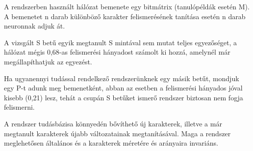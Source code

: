 A rendszerben használt hálózat bemenete egy bitmátrix (tanulópéldák esetén M). A bemenetet n darab különböző karakter felismerésének tanítása esetén n darab neuronnak adjuk át.

A vizsgált S betű egyik megtanult S mintával sem mutat teljes egyezőséget, a hálózat mégis 0,68-as felismerési hányadost számolt ki hozzá, amelynél már megállapíthatjuk az egyezést.

Ha ugyanennyi tudással rendelkező rendszerünknek egy másik betűt, mondjuk egy P-t adunk meg bemenetként, abban az esetben a felismerési hányados jóval kisebb (0,21) lesz, tehát a csupán S betűket ismerő rendszer biztosan nem fogja felismerni.

A rendszer tudásbázisa könnyedén bővíthető új karakterek, illetve a már megtanult karakterek újabb változatainak megtanításával. Maga a rendszer meglehetősen általános és a karakterek méretére és arányaira invariáns.